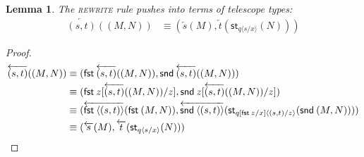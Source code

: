 \documentclass[10pt]{article}
\newtheorem{lemma}{Lemma}
\theoremstyle{definition}
\newcommand\dsd[1]{\ensuremath{\mathsf{#1}}}
\newcommand{\app}[2]{\ensuremath{#1 \: #2}}
\newcommand{\fst}[1]{\app{\dsd{fst}}{#1}}
\newcommand{\snd}[1]{\app{\dsd{snd}}{#1}}
\newcommand{\id}{\mathsf{id}}
\newcommand{\rewrite}[2]{\overleftarrow{#1}(#2)}
\newcommand\StI[2]{\ensuremath{\mathsf{st}_{#1}(#2)}}
\newcommand\UnSt[2]{\ensuremath{\mathsf{unst}_{#1}(#2)}}
\newcommand\ap[2]{\ensuremath{#1 \langle #2 \rangle }}
\begin{document}
\begin{lemma}
The \textsc{rewrite} rule pushes into terms of telescope types:
\begin{align*}
\rewrite{(s, t)}{(M, N)} &\equiv (\rewrite{s}{M}, \rewrite{t}{\StI{\ap{q}{s/x}}{N}} ) 
\end{align*}
\end{lemma}
\begin{proof}
\begin{align*}
\rewrite{(s, t)}{(M, N)} 
&\equiv (\fst\rewrite{(s, t)}{(M, N)}, \snd \rewrite{(s, t)}{(M, N)} ) \\
&\equiv (\fst z [\rewrite{(s, t)}{(M, N)}/z], \snd z [\rewrite{(s, t)}{(M, N)}/z] ) \\
&\equiv (\rewrite{\ap{\fst}{(s, t)}}{\fst (M, N)}, \rewrite{\ap{\snd}{(s, t)}}{\StI{\ap{q[\fst z/x]}{(s, t)/z}}{\snd (M, N)}} ) \\
&\equiv (\rewrite{s}{M}, \rewrite{t}{\StI{\ap{q}{s/x}}{N}} )
\end{align*}


\end{proof}
\end{document}
